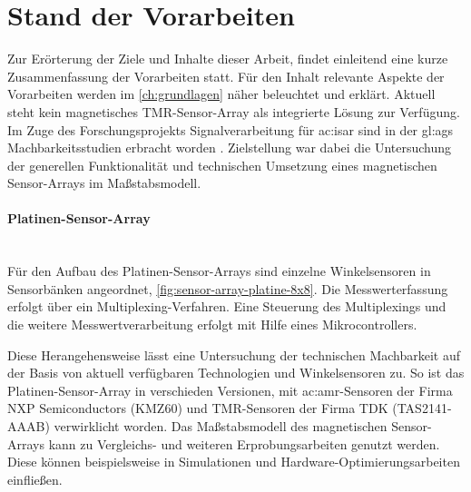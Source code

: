 %

\section{Stand der Vorarbeiten}\label{sec:stand-der-vorarbeiten}

Zur Erörterung der Ziele und Inhalte dieser Arbeit, findet einleitend eine kurze Zusammenfassung der Vorarbeiten statt.
Für den Inhalt relevante Aspekte der Vorarbeiten werden im \autoref{ch:grundlagen} näher beleuchtet und erklärt.
\newline
Aktuell steht kein magnetisches TMR-Sensor-Array als integrierte Lösung zur Verfügung. Im Zuge des Forschungsprojekts Signalverarbeitung für \gls{ac:isar} sind in der \gls{gl:ags} Machbarkeitsstudien erbracht worden \cite{Mehm2019}\cite{Ernsting2020}. Zielstellung war dabei die Untersuchung der generellen Funktionalität und technischen Umsetzung eines magnetischen Sensor-Arrays im Maßstabsmodell.


\paragraph{Platinen-Sensor-Array}\label{par:platinen-sensor-array}$~$\\


Für den Aufbau des Platinen-Sensor-Arrays sind einzelne Winkelsensoren in Sensorbänken angeordnet, \autoref{fig:sensor-array-platine-8x8}. Die Messwerterfassung erfolgt über ein Multiplexing-Verfahren. Eine Steuerung des Multiplexings und die weitere Messwertverarbeitung erfolgt mit Hilfe eines Mikrocontrollers.

Diese Herangehensweise lässt eine Untersuchung der technischen Machbarkeit auf der Basis von aktuell verfügbaren Technologien und Winkelsensoren zu.
So ist das Platinen-Sensor-Array in verschieden Versionen, mit \gls{ac:amr}-Sensoren der Firma NXP Semiconductors 
(KMZ60) \cite{NXPSemiconductors2014} und TMR-Sensoren der Firma TDK (TAS2141-AAAB) \cite{TDK2016} verwirklicht worden. 
Das Maßstabsmodell des magnetischen Sensor-Arrays kann zu Vergleichs- und weiteren Erprobungsarbeiten genutzt werden. 
Diese können beispielsweise in Simulationen und Hardware-Optimierungsarbeiten einfließen.


\clearpage


